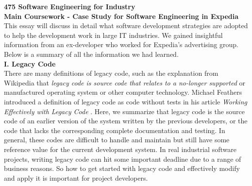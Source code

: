 \documentclass[11pt]{article}
\begin{document}
{\bf 475 Software Engineering for Industry} \\
{\bf Main Coursework - Case Study for Software Engineering in Expedia}\\[10px]
This essay will discuss in detail what software development strategies are adopted to help the development work in large IT industries. We gained insightful information from an ex-developer who worked for Expedia’s advertising group. Below is a summary of all the information we had learned.\\[10px]
{\bf I. Legacy Code}\\[10px]
There are many definitions of legacy code, such as the explanation from Wikipedia that \textit{legacy code is source code that relates to a no-longer supported} \cite{no1} or manufactured operating system or other computer technology. Michael Feathers introduced a definition of legacy code as code without tests in his article \textit{Working Effectively with Legacy Code} \cite{no2}. Here, we summarize that legacy code is the source code of an earlier version of the system written by the previous developers, or the code that lacks the corresponding complete documentation and testing. In general, these codes are difficult to handle and maintain but still have some reference value for the current development system. In real industrial software projects, writing legacy code can hit some important deadline due to a range of business reasons. So how to get started with legacy code and effectively modify and apply it is important for project developers.\\[10px]
\end{document}
